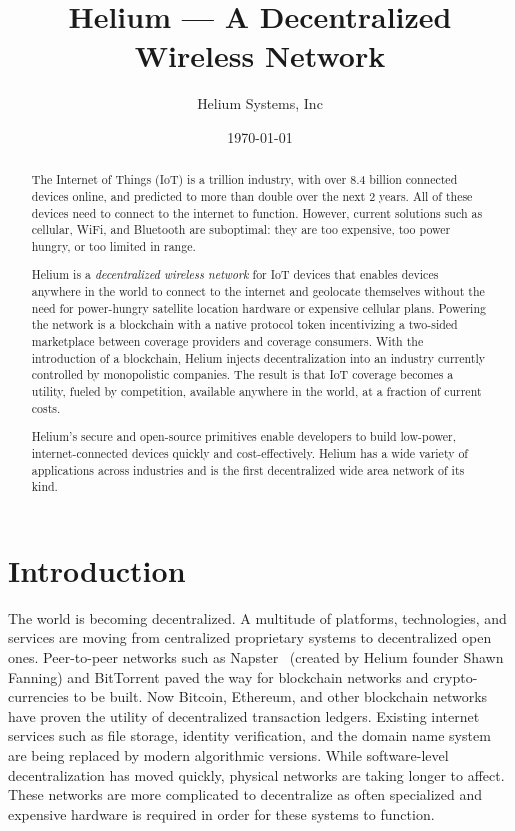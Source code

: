 \documentclass[letterpaper,11pt]{article}
\begin{document}
\title{Helium --- A Decentralized Wireless Network}
\author{Helium Systems, Inc}
\date{\today}
\maketitle
\thispagestyle{empty}

\begin{abstract}
The Internet of Things (IoT) is a  trillion industry, with over 8.4 billion connected devices online, and predicted to more than double over the next 2 years. All of these devices need to connect to the internet to function. However, current solutions such as cellular, WiFi, and Bluetooth are suboptimal: they are too expensive, too power hungry, or too limited in range.

Helium is a \emph{decentralized wireless network} for IoT devices that enables devices anywhere in the world to connect to the internet and geolocate themselves without the need for power-hungry satellite location hardware or expensive cellular plans. Powering the network is a blockchain with a native protocol token incentivizing a two-sided marketplace between coverage providers and coverage consumers. With the introduction of a blockchain, Helium injects decentralization into an industry currently controlled by monopolistic companies. The result is that IoT coverage becomes a utility, fueled by competition, available anywhere in the world, at a fraction of current costs.

Helium's secure and open-source primitives enable developers to build low-power, internet-connected devices quickly and cost-effectively. Helium has a wide variety of applications across industries and is the first decentralized wide area network of its kind.
\end{abstract}

\newpage

\tableofcontents
\newpage

\section{Introduction}

The world is becoming decentralized. A multitude of platforms, technologies, and services are moving from centralized proprietary systems to decentralized open ones. Peer-to-peer networks such as Napster~\cite{napster} (created by Helium founder Shawn Fanning) and BitTorrent paved the way for blockchain networks and crypto-currencies to be built. Now Bitcoin, Ethereum, and other blockchain networks have proven the utility of decentralized transaction ledgers. Existing internet services such as file storage, identity verification, and the domain name system are being replaced by modern algorithmic versions. While software-level decentralization has moved quickly, physical networks are taking longer to affect. These networks are more complicated to decentralize as often specialized and expensive hardware is required in order for these systems to function.
\end{document}
